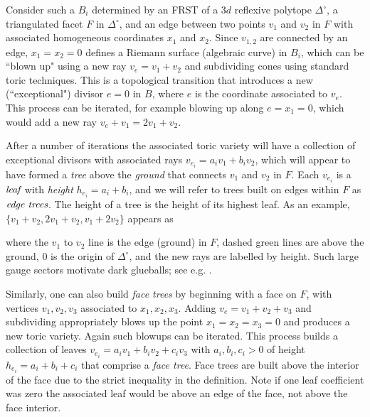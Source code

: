 \documentclass[aps,prl,twocolumn, superscriptaddress,groupedaddress,nofootinbib]{revtex4-1}
\begin{document}
Consider such a $B_i$ determined by an FRST of a $3d$ reflexive polytope
$\Delta^\circ$, a triangulated facet $F$ in $\Delta^\circ$, and an edge
between two points $v_1$ and $v_2$ in $F$ with
associated homogeneous coordinates $x_1$ and $x_2$. Since $v_{1,2}$ are connected
by an edge, $x_1=x_2=0$ defines a Riemann surface (algebraic curve)
in $B_i$, which can be ``blown up" using a new ray $v_e=v_1+v_2$ and subdividing
cones using standard toric techniques. This is a topological transition that introduces
a new (``exceptional") divisor $e=0$ in $B$, where $e$ is the coordinate associated to $v_e$.
This
process can be iterated, for example blowing up along $e=x_1=0$, which would
add a new ray $v_e+v_1=2v_1+v_2$.

After a number of iterations the associated toric variety will have a
collection of exceptional divisors with associated rays $v_{e_i}=a_i v_1 + b_i
v_2$, which will appear to have formed a \emph{tree} above the \emph{ground}
that connects $v_1$ and $v_2$ in $F$. Each $v_{e_i}$ is a $\emph{leaf}$ with
\emph{height} $h_{e_i}=a_i+b_i$, and  we will refer to trees built on edges
within $F$ as $\emph{edge trees}$. The height of a tree is the height of its
highest leaf. As an example, $\{v_1+v_2,2v_1+v_2,v_1+2v_2\}$ appears as
\begin{center} 
\end{center} where the $v_1$ to $v_2$ line is the
edge (ground) in $F$, dashed green lines are above the ground, $0$ is the origin of $\Delta^\circ$, and the new rays
are labelled by height. {\color{red}Such large gauge sectors
motivate dark glueballs; see e.g. \cite{Halverson:2016nfq,*Soni:2016yes,*daRocha:2017cxu,*Acharya:2017szw,*Soni:2017nlm}.}

Similarly, one can also build \emph{face trees} by beginning with a face on
$F$, with vertices $v_1, v_2, v_3$ associated to $x_1, x_2, x_3$. Adding $v_e=v_1+v_2+v_3$ and subdividing
appropriately blows up the point $x_1=x_2=x_3=0$  and produces a new toric
variety. Again such blowups can be iterated. This process builds a collection
of leaves $v_{e_i}=a_i v_1 + b_i v_2 + c_i v_3$ with $a_i,b_i,c_i > 0$ of
height $h_{e_i}=a_i+b_i+c_i$ that comprise a \emph{face tree}. Face trees are
built above the interior of the face due to the strict inequality in the
definition. Note if one leaf coefficient was zero the associated leaf would be
above an edge of the face, not above the face interior.
\end{document}
